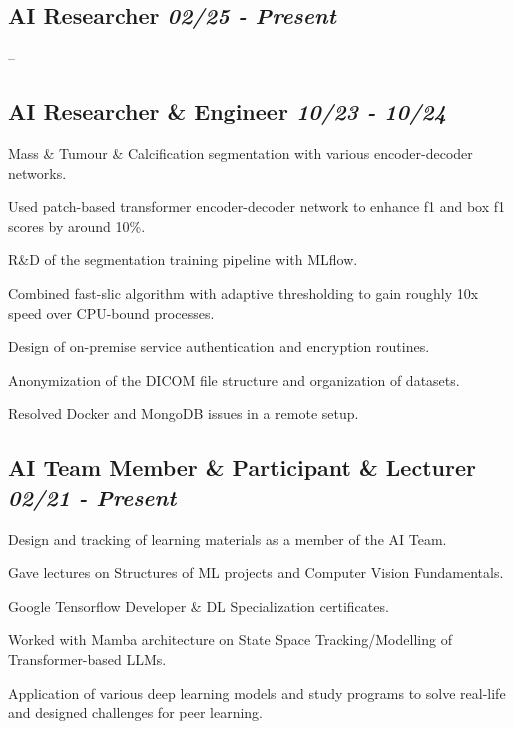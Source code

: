 \documentclass[letter, 14pt]{article}
\begin{document}
\subsection{AI Researcher \hfill \textit{\textmd{02/25 - Present}}}
\begin{zitemize}
\item --
\end{zitemize}


\subsection{AI Researcher \& Engineer \hfill \textit{\textmd{10/23 - 10/24}}}
\begin{zitemize}
\item Mass \& Tumour \& Calcification segmentation with various encoder-decoder networks.
\item Used patch-based transformer encoder-decoder network to enhance f1 and box f1 scores by around 10\%.
\item R\&D of the segmentation training pipeline with MLflow.
\item Combined fast-slic algorithm with adaptive thresholding to gain roughly 10x speed over CPU-bound processes.
\item Design of on-premise service authentication and encryption routines.
\item Anonymization of the DICOM file structure and organization of datasets.
\item Resolved Docker and MongoDB issues in a remote setup. 
\end{zitemize}


\subsection{AI Team Member \& Participant \& Lecturer \hfill\textit{\textmd{02/21 - Present}}}
\begin{zitemize}
\item Design and tracking of learning materials as a member of the AI Team.
\item Gave lectures on Structures of ML projects and Computer Vision Fundamentals.
\item Google Tensorflow Developer \& DL Specialization certificates.
\item Worked with Mamba architecture on State Space Tracking/Modelling of Transformer-based LLMs.
\item Application of various deep learning models and study programs to solve real-life and designed challenges for peer learning.
\end{zitemize}
\end{document}
